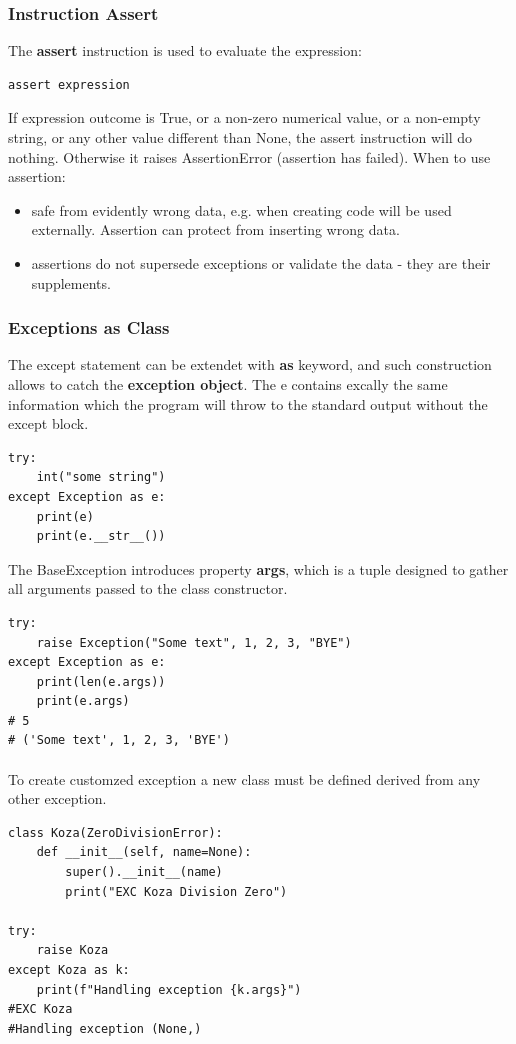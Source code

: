 \documentclass{article}
\begin{document}
\subsubsection{Instruction Assert}
The \textbf{assert} instruction is used to evaluate the expression:
\begin{lstlisting}[style=pystyle]
assert expression
\end{lstlisting}
If expression outcome is True, or a non-zero numerical value, or a non-empty string, or any other value different than None, the assert instruction will do nothing. Otherwise it raises \textcolor{pythonerror}{AssertionError} (assertion has failed). When to use assertion:
\begin{itemize}
\item safe from evidently wrong data, e.g. when creating code will be used externally. Assertion can protect from inserting wrong data.
\item assertions do not supersede exceptions or validate the data - they are their supplements.
\end{itemize}

\subsubsection{Exceptions as Class}
The except statement can be extendet with \textbf{as} keyword, and such construction allows to catch the \textbf{exception object}. The e contains excally the same information which the program will throw to the standard output without the except block.
\begin{lstlisting}[style=pystyle]
try:
	int("some string")
except Exception as e:
	print(e)
	print(e.__str__())
\end{lstlisting}
The BaseException introduces property \textbf{args}, which is a tuple designed to gather all arguments passed to the class constructor.
\begin{lstlisting}[style=pystyle]
try:
	raise Exception("Some text", 1, 2, 3, "BYE")
except Exception as e:
	print(len(e.args))
	print(e.args)
# 5
# ('Some text', 1, 2, 3, 'BYE')
\end{lstlisting}
\paragraph{}
To create customzed exception a new class must be defined derived from any other exception.
\begin{lstlisting}[style=pystyle]
class Koza(ZeroDivisionError):
    def __init__(self, name=None):
    	super().__init__(name)
    	print("EXC Koza Division Zero")

try:
	raise Koza
except Koza as k:
	print(f"Handling exception {k.args}")    
#EXC Koza
#Handling exception (None,)
\end{lstlisting}
\end{document}
